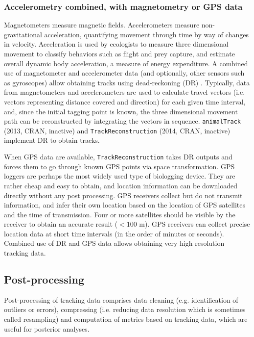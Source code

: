 \documentclass[a4paper,12pt]{article}
\newcommand{\Rpkg}[1]{\texttt{#1}}
\begin{document}
\subsubsection*{Accelerometry combined, with magnetometry or GPS data} 

Magnetometers measure magnetic fields. Accelerometers measure non-gravitational acceleration, quantifying movement through time by way of changes in velocity. Acceleration is used by ecologists to measure three dimensional movement to classify behaviors such as flight and prey capture, and estimate overall dynamic body acceleration, a measure of energy expenditure. A combined use of magnetometer and accelerometer data (and optionally, other sensors such as gyroscopes) allow obtaining tracks using dead-reckoning (DR) \citep{Wilson2007,Bidder2015,Williams2017}. Typically, data from magnetometers and accelerometers are used to calculate travel vectors (i.e. vectors representing distance covered and direction) for each given time interval, and, since the initial tagging point is known, the three dimensional movement path can be reconstructed by integrating the vectors in sequence. \Rpkg{animalTrack} (2013, CRAN, inactive) and \Rpkg{TrackReconstruction} (2014, CRAN, inactive) implement DR to obtain tracks.

When GPS data are available, \Rpkg{TrackReconstruction} takes DR outputs and forces them to go through known GPS points via space transformation. 
GPS loggers are perhaps the most widely used type of biologging device. They are rather cheap and easy to obtain, and location information can be downloaded directly without any post processing. GPS receivers collect but do not transmit information, and infer their own location based on the location of GPS satellites and the time of transmission. Four or more satellites should be visible by the receiver to obtain an accurate result ($<100$ m). GPS receivers can collect precise location data at short time intervals (in the order of minutes or seconds). %
Combined use of DR and GPS data allows obtaining very high resolution tracking data. 

\subsection*{Post-processing}

Post-processing of tracking data comprises data cleaning (e.g. identification of outliers or errors), compressing (i.e. reducing data resolution which is sometimes called resampling)
and computation of metrics based on tracking data, which are useful for posterior analyses.
\end{document}
